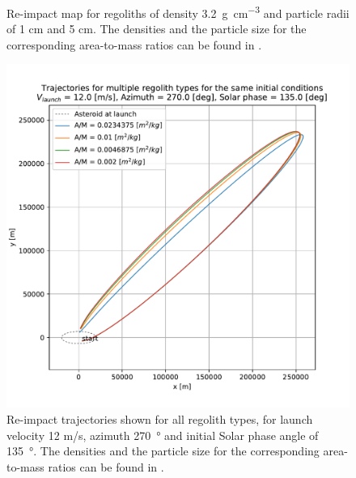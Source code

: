 \documentclass[print]{tudelft-report}
\begin{document}
\begin{appendices}
\begin{figure}[htb]
    \caption{Re-impact map for regoliths of density \SI{3.2}{\gram\per\centi\metre\cubed} and particle radii of 1 cm and 5 cm. The densities and the particle size for the corresponding area-to-mass ratios can be found in .}
    \label{fig:trailingEdge_crashmap_3P2_density_1cm_5cm_radius}
    \end{figure}
    \FloatBarrier
    \begin{figure}[htb]
    \centering
    \captionsetup{justification=centering}
    \includegraphics[width=\textwidth, height=0.5\textheight, keepaspectratio=true]{Results/Images/trailing_edge_perturbations/reimpact_traj_12ms_270Azim_135solarPhase.pdf}
    \caption{Re-impact trajectories shown for all regolith types, for launch velocity 12 m/s, azimuth \SI{270}{\degree} and initial Solar phase angle of \SI{135}{\degree}. The densities and the particle size for the corresponding area-to-mass ratios can be found in .}
    \label{fig:trailingEdge_reimpact_traj_12ms_270azim_135solar}
    \end{figure}
    \FloatBarrier
    \begin{figure}[htb]
    \centering
    \captionsetup{justification=centering}

\end{figure}
\end{appendices}
\end{document}
